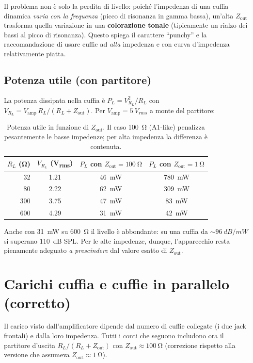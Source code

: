 Il problema non è solo la perdita di livello: poiché l'impedenza di una
cuffia dinamica \emph{varia con la frequenza} (picco di risonanza in
gamma bassa), un'alta $Z_{\text{out}}$ trasforma quella variazione in una
\textbf{colorazione tonale} (tipicamente un rialzo dei bassi al picco di
risonanza). Questo spiega il carattere ``punchy'' e la raccomandazione di
usare cuffie ad \emph{alta} impedenza e con curva d'impedenza
relativamente piatta.

\subsection{Potenza utile (con partitore)}
La potenza dissipata nella cuffia è $P_L=V_{R_L}^2/R_L$ con
$V_{R_L}=V_{\text{amp}}\,R_L/(R_L+Z_{\text{out}})$. Per
$V_{\text{amp}}=\SI{5}{V_{rms}}$ a monte del partitore:

\begin{table}[H]
  \centering
  \begin{tabular}{rccc}
    \toprule
    $R_L$ (\si{\ohm}) & $V_{R_L}$ (\si{V_{rms}}) & $P_L$ con $Z_{\text{out}}=\SI{100}{\ohm}$ & $P_L$ con $Z_{\text{out}}=\SI{1}{\ohm}$ \\
    \midrule
    32  & 1.21 & \SI{46}{mW}  & \SI{780}{mW} \\
    80  & 2.22 & \SI{62}{mW}  & \SI{309}{mW} \\
    300 & 3.75 & \SI{47}{mW}  & \SI{83}{mW}  \\
    600 & 4.29 & \SI{31}{mW}  & \SI{42}{mW}  \\
    \bottomrule
  \end{tabular}
  \caption{Potenza utile in funzione di $Z_{\text{out}}$. Il caso
  \SI{100}{\ohm} (A1-like) penalizza pesantemente le basse impedenze; per
  alta impedenza la differenza è contenuta.}
\end{table}

Anche con \SI{31}{mW} su \SI{600}{\ohm} il livello è abbondante: su una
cuffia da $\sim\SI{96}{dB/mW}$ si superano \SI{110}{dB} SPL. Per le alte
impedenze, dunque, l'apparecchio resta pienamente adeguato \emph{a
prescindere} dal valore esatto di $Z_{\text{out}}$.

\section{Carichi cuffia e cuffie in parallelo (corretto)}\label{sec:carichi}
Il carico visto dall'amplificatore dipende dal numero di cuffie collegate
(i due jack frontali) e dalla loro impedenza. Tutti i conti che seguono
includono ora il partitore d'uscita $R_L/(R_L+Z_{\text{out}})$ con
$Z_{\text{out}}\approx\SI{100}{\ohm}$ (correzione rispetto alla versione
che assumeva $Z_{\text{out}}\approx\SI{1}{\ohm}$).

